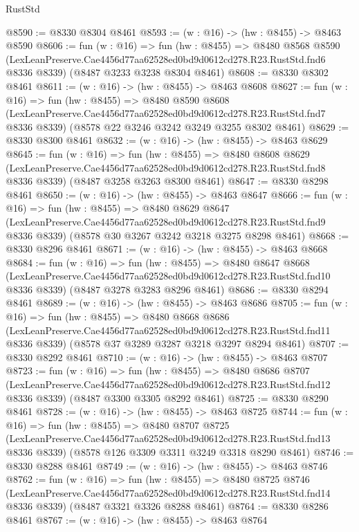 \begin{lexlean}{RustStd}
\begin{coremodule}
@8590 := @8330 @8304 @8461
@8593 := (w : @16) -> (hw : @8455) -> @8463 @8590
@8606 := fun (w : @16) =>
  fun (hw : @8455) =>
  @8480
    @8568
    @8590
    (LexLeanPreserve.Cae4456d77aa62528ed0bd9d0612cd278.R23.RustStd.fnd6 @8336 @8339)
    (@8487 @3233 @3238 @8304 @8461)
@8608 := @8330 @8302 @8461
@8611 := (w : @16) -> (hw : @8455) -> @8463 @8608
@8627 := fun (w : @16) =>
  fun (hw : @8455) =>
  @8480
    @8590
    @8608
    (LexLeanPreserve.Cae4456d77aa62528ed0bd9d0612cd278.R23.RustStd.fnd7 @8336 @8339)
    (@8578 @22 @3246 @3242 @3249 @3255 @8302 @8461)
@8629 := @8330 @8300 @8461
@8632 := (w : @16) -> (hw : @8455) -> @8463 @8629
@8645 := fun (w : @16) =>
  fun (hw : @8455) =>
  @8480
    @8608
    @8629
    (LexLeanPreserve.Cae4456d77aa62528ed0bd9d0612cd278.R23.RustStd.fnd8 @8336 @8339)
    (@8487 @3258 @3263 @8300 @8461)
@8647 := @8330 @8298 @8461
@8650 := (w : @16) -> (hw : @8455) -> @8463 @8647
@8666 := fun (w : @16) =>
  fun (hw : @8455) =>
  @8480
    @8629
    @8647
    (LexLeanPreserve.Cae4456d77aa62528ed0bd9d0612cd278.R23.RustStd.fnd9 @8336 @8339)
    (@8578 @30 @3267 @3242 @3218 @3275 @8298 @8461)
@8668 := @8330 @8296 @8461
@8671 := (w : @16) -> (hw : @8455) -> @8463 @8668
@8684 := fun (w : @16) =>
  fun (hw : @8455) =>
  @8480
    @8647
    @8668
    (LexLeanPreserve.Cae4456d77aa62528ed0bd9d0612cd278.R23.RustStd.fnd10 @8336 @8339)
    (@8487 @3278 @3283 @8296 @8461)
@8686 := @8330 @8294 @8461
@8689 := (w : @16) -> (hw : @8455) -> @8463 @8686
@8705 := fun (w : @16) =>
  fun (hw : @8455) =>
  @8480
    @8668
    @8686
    (LexLeanPreserve.Cae4456d77aa62528ed0bd9d0612cd278.R23.RustStd.fnd11 @8336 @8339)
    (@8578 @37 @3289 @3287 @3218 @3297 @8294 @8461)
@8707 := @8330 @8292 @8461
@8710 := (w : @16) -> (hw : @8455) -> @8463 @8707
@8723 := fun (w : @16) =>
  fun (hw : @8455) =>
  @8480
    @8686
    @8707
    (LexLeanPreserve.Cae4456d77aa62528ed0bd9d0612cd278.R23.RustStd.fnd12 @8336 @8339)
    (@8487 @3300 @3305 @8292 @8461)
@8725 := @8330 @8290 @8461
@8728 := (w : @16) -> (hw : @8455) -> @8463 @8725
@8744 := fun (w : @16) =>
  fun (hw : @8455) =>
  @8480
    @8707
    @8725
    (LexLeanPreserve.Cae4456d77aa62528ed0bd9d0612cd278.R23.RustStd.fnd13 @8336 @8339)
    (@8578 @126 @3309 @3311 @3249 @3318 @8290 @8461)
@8746 := @8330 @8288 @8461
@8749 := (w : @16) -> (hw : @8455) -> @8463 @8746
@8762 := fun (w : @16) =>
  fun (hw : @8455) =>
  @8480
    @8725
    @8746
    (LexLeanPreserve.Cae4456d77aa62528ed0bd9d0612cd278.R23.RustStd.fnd14 @8336 @8339)
    (@8487 @3321 @3326 @8288 @8461)
@8764 := @8330 @8286 @8461
@8767 := (w : @16) -> (hw : @8455) -> @8463 @8764

\end{coremodule}
\end{lexlean}
